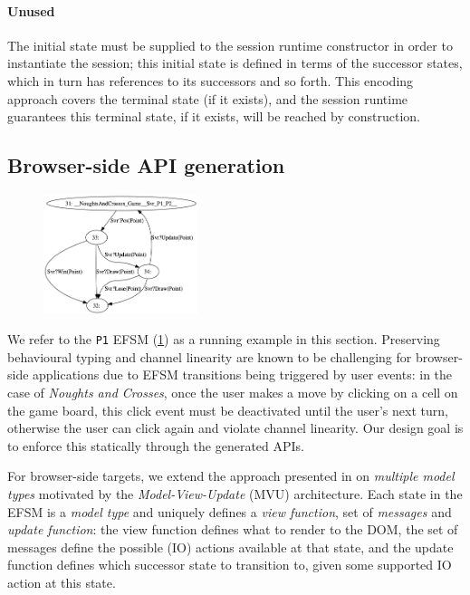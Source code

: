 \paragraph{Unused}
The initial state must be supplied to the session runtime
constructor in order to instantiate the session;
this initial state is defined
in terms of the successor states, which in turn has references to its
successors and so forth.
This encoding approach covers the terminal state (if it exists), and the
session runtime guarantees this terminal state, if it exists, will be reached
by construction.

\subsection{Browser-side API generation}
\label{section:browser}

\begin{figure}
  \begin{center}
    \includegraphics[width=0.4\textwidth]{figures/efsm_p1.png}
  \end{center}

  \label{fig:efsmp1}
\end{figure}

We refer to the \texttt{P1} EFSM (\cref{fig:efsmp1}) as a running example in
this section.
Preserving behavioural typing and channel linearity are known to be challenging
for browser-side applications due to EFSM transitions being triggered by user
events:
in the case of \textit{Noughts and Crosses}, once the user makes a move by
clicking on a cell on the game board, this click event must be deactivated
until the user's next turn, otherwise the user can click again and violate
channel linearity.
Our design goal is to enforce this statically through the generated APIs.

For browser-side targets, we extend the approach presented in \cite{MVU2019} on
\textit{multiple model types} motivated by the \textit{Model-View-Update} (MVU)
architecture.
Each state in the EFSM is a \emph{model type} and uniquely defines a
\textit{view function}, set of \textit{messages} and \textit{update function}:
the view function defines what to render to the DOM, the set of messages define
the possible (IO) actions available at that state, and the update function
defines which successor state to transition to, given some supported IO action
at this state.

